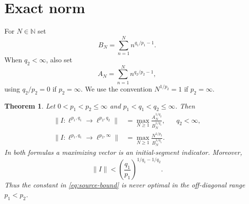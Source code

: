 \documentclass[11pt]{article}
\newtheorem{theorem}{Theorem}
\newcommand{\N}{\mathbb{N}}
\begin{document}
\section{Exact norm}

For $N\in\N$ set
\begin{equation}\label{eq:BN}
 B_N=\sum_{n=1}^N n^{q_1/p_1-1}.
\end{equation}
When $q_2<\infty$, also set
\begin{equation}\label{eq:AN}
 A_N=\sum_{n=1}^N n^{q_2/p_2-1},
\end{equation}
using $q_2/p_2=0$ if $p_2=\infty$.  We use the convention
$N^{1/p_2}=1$ if $p_2=\infty$.

\begin{theorem}\label{thm:main}
Let $0<p_1<p_2\leq\infty$ and $p_1<q_1<q_2\leq\infty$. Then
\begin{align}
 \|I:\ell^{p_1,q_1}\to\ell^{p_2,q_2}\|
 &=\max_{N\geq1}\frac{A_N^{1/q_2}}{B_N^{1/q_1}},
 &&q_2<\infty,\label{eq:finite-formula}\\
 \|I:\ell^{p_1,q_1}\to\ell^{p_2,\infty}\|
 &=\max_{N\geq1}\frac{N^{1/p_2}}{B_N^{1/q_1}}.
 &&\label{eq:infty-formula}
\end{align}
In both formulas a maximizing vector is an initial-segment indicator.
Moreover,
\begin{equation}\label{eq:strict}
 \|I\|<\left(\frac{q_1}{p_1}\right)^{1/q_1-1/q_2}.
\end{equation}
Thus the constant in \eqref{eq:source-bound} is never optimal in the
off-diagonal range $p_1<p_2$.
\end{theorem}
\end{document}
